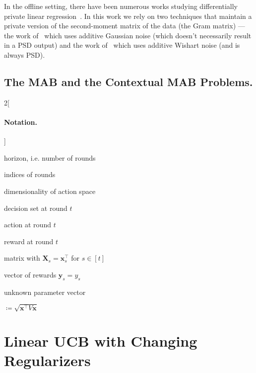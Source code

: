 \documentclass{article}
\renewcommand{\vec}[1]{\bm{#1}}
\newcommand{\defeq}{\coloneq}
\newcommand{\Real}{\mathds{R}}
\newcommand{\D}{\mathcal{D}}
\providecommand\transp{\top}
\let\transpsymbol\transp
\renewcommand{\transp}[1]{#1^\transpsymbol}
\begin{document}
In the offline setting, there have been numerous works studying differentially private linear regression~\citep{ChaudhuriDPERM2011,BassilyPrivateEmpiricalRisk2014}. In this work we rely on two techniques that maintain a private version of the second-moment matrix of the data (the Gram matrix) --- the work of~\cite{DworkAnalyzeGauss2014} which uses additive Gaussian noise (which doesn't necessarily result in a PSD output) and the work of~\cite{SheffetPrivateApproxRegression2015} which uses additive Wishart noise (and is always PSD).

\subsection{The MAB and the Contextual MAB Problems.}

\begin{multicols}{2}[\paragraph{Notation.}\label{sec:notation}]
  \nolinenumbers
  \begin{description}[style=sameline,leftmargin=5em,nosep]
  \item[$n$] horizon, i.e. number of rounds
  \item[$s,t$] indices of rounds
  \item[$d$] dimensionality of action space
  \item[$\D_t\subset\Real^d$] decision set at round $t$
  \item[$\vec x_t \in \D_t$] action at round $t$
  \item[$y_t \in \Real$] reward at round $t$
  \item[$\vec X_t \in \Real^{t\times d}$] matrix with $\vec X_s = \transp{\vec
      x_s}$ for $s\in[t]$
  \item[$\vec y_t \in \Real^t$] vector of rewards $\vec y_s = y_s$
  \item[$\vec\theta^* \in \Real^d$] unknown parameter vector
  \item[$\norm{V}{\vec x}$] $\defeq \sqrt{\transp{\vec x} V \vec x}$
  \end{description}
  \linenumbers
\end{multicols}

\section{Linear UCB with Changing Regularizers}
\label{sec:LinUCB}
\end{document}
